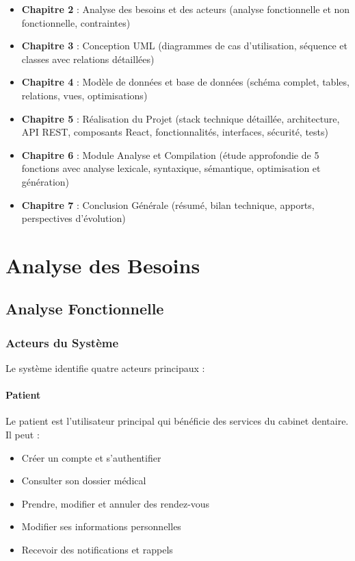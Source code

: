 \documentclass[12pt,a4paper]{report}
\begin{document}
\begin{itemize}
    \item \textbf{Chapitre 2} : Analyse des besoins et des acteurs (analyse fonctionnelle et non fonctionnelle, contraintes)
    \item \textbf{Chapitre 3} : Conception UML (diagrammes de cas d'utilisation, séquence et classes avec relations détaillées)
    \item \textbf{Chapitre 4} : Modèle de données et base de données (schéma complet, tables, relations, vues, optimisations)
    \item \textbf{Chapitre 5} : Réalisation du Projet (stack technique détaillée, architecture, API REST, composants React, fonctionnalités, interfaces, sécurité, tests)
    \item \textbf{Chapitre 6} : Module Analyse et Compilation (étude approfondie de 5 fonctions avec analyse lexicale, syntaxique, sémantique, optimisation et génération)
    \item \textbf{Chapitre 7} : Conclusion Générale (résumé, bilan technique, apports, perspectives d'évolution)
\end{itemize}

\chapter{Analyse des Besoins}

\section{Analyse Fonctionnelle}

\subsection{Acteurs du Système}

Le système identifie quatre acteurs principaux :

\subsubsection{Patient}

Le patient est l'utilisateur principal qui bénéficie des services du cabinet dentaire. Il peut :
\begin{itemize}
    \item Créer un compte et s'authentifier
    \item Consulter son dossier médical
    \item Prendre, modifier et annuler des rendez-vous
    \item Modifier ses informations personnelles
    \item Recevoir des notifications et rappels
\end{itemize}
\end{document}
